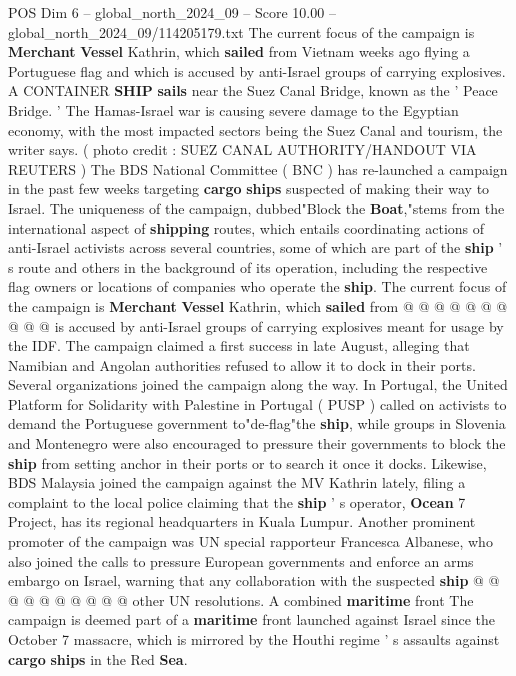 \begin{textsample}{POS Dim 6 – global\_north\_2024\_09 – Score 10.00 – global\_north\_2024\_09/114205179.txt}  \label{ex:f6_pos_361}
The current focus of the campaign is \textbf{Merchant} \textbf{Vessel} Kathrin, which \textbf{sailed} from Vietnam weeks ago flying a Portuguese flag and which is accused by anti-Israel groups of carrying explosives.
A CONTAINER \textbf{SHIP} \textbf{sails} near the Suez Canal Bridge, known as the ' Peace Bridge. ' The Hamas-Israel war is causing severe damage to the Egyptian economy, with the most impacted sectors being the Suez Canal and tourism, the writer says. ( photo credit : SUEZ CANAL AUTHORITY/HANDOUT VIA REUTERS ) The BDS National Committee ( BNC ) has re-launched a campaign in the past few weeks targeting \textbf{cargo} \textbf{ships} suspected of making their way to Israel.
The uniqueness of the campaign, dubbed"Block the \textbf{Boat},"stems from the international aspect of \textbf{shipping} routes, which entails coordinating actions of anti-Israel activists across several countries, some of which are part of the \textbf{ship} ' s route and others in the background of its operation, including the respective flag owners or locations of companies who operate the \textbf{ship}.
The current focus of the campaign is \textbf{Merchant} \textbf{Vessel} Kathrin, which \textbf{sailed} from @ @ @ @ @ @ @ @ @ @ is accused by anti-Israel groups of carrying explosives meant for usage by the IDF.
The campaign claimed a first success in late August, alleging that Namibian and Angolan authorities refused to allow it to dock in their ports.
Several organizations joined the campaign along the way.
In Portugal, the United Platform for Solidarity with Palestine in Portugal ( PUSP ) called on activists to demand the Portuguese government to"de-flag"the \textbf{ship}, while groups in Slovenia and Montenegro were also encouraged to pressure their governments to block the \textbf{ship} from setting anchor in their ports or to search it once it docks.
Likewise, BDS Malaysia joined the campaign against the MV Kathrin lately, filing a complaint to the local police claiming that the \textbf{ship} ' s operator, \textbf{Ocean} 7 Project, has its regional headquarters in Kuala Lumpur.
Another prominent promoter of the campaign was UN special rapporteur Francesca Albanese, who also joined the calls to pressure European governments and enforce an arms embargo on Israel, warning that any collaboration with the suspected \textbf{ship} @ @ @ @ @ @ @ @ @ @ other UN resolutions.
A combined \textbf{maritime} front The campaign is deemed part of a \textbf{maritime} front launched against Israel since the October 7 massacre, which is mirrored by the Houthi regime ' s assaults against \textbf{cargo} \textbf{ships} in the Red \textbf{Sea}.

\end{textsample}

